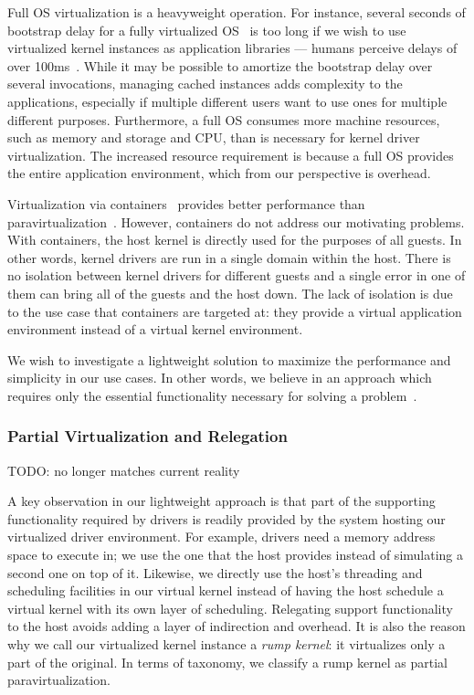 Full OS virtualization is a heavyweight operation.  For
instance, several seconds of bootstrap delay for a fully virtualized
OS~\cite{jiang:soda} is too long if we wish to use virtualized
kernel instances as application libraries --- humans perceive delays
of over 100ms~\cite{miller:100ms}.  While it may be possible to
amortize the bootstrap delay over several invocations, managing
cached instances adds complexity to the applications, especially
if multiple different users want to use ones for multiple different
purposes.  Furthermore, a full OS consumes more machine resources,
such as memory and storage and CPU, than is necessary for kernel
driver virtualization.  The increased resource requirement is because
a full OS provides the entire application environment, which from our
perspective is overhead.

Virtualization via containers~\cite{phk:jails} provides better
performance than
paravirtualization~\cite{soltesz:containers,wang:overhead}.
However, containers do not address our motivating problems.
With containers, the host kernel is directly used for the purposes
of all guests.  In other words, kernel drivers are run in a single
domain within the host.  There is no isolation between kernel
drivers for different guests and a single error in one of them can
bring all of the guests and the host down.  The lack of isolation is due
to the use case that containers are targeted at: they provide a virtual
application environment instead of a virtual kernel environment.

We wish to investigate a lightweight solution to maximize the
performance and simplicity in our use cases.  In other words, we
believe in an approach which requires only the essential
functionality necessary for solving a
problem~\cite{lampson:bestpaperever}.

\subsubsection{Partial Virtualization and Relegation}

TODO: no longer matches current reality

A key observation in our lightweight approach is that part of the
supporting functionality required by drivers is readily provided
by the system hosting our virtualized driver environment.  For
example, drivers need a memory address space to execute in; we use
the one that the host provides instead of simulating a second one
on top of it.  Likewise, we directly use the host's threading and
scheduling facilities in our virtual kernel instead of having the
host schedule a virtual kernel with its own layer of scheduling.
Relegating support functionality to the host avoids adding a layer
of indirection and overhead.  It is also the reason why we call
our virtualized kernel instance a \textit{rump kernel}: it virtualizes
only a part of the original.  In terms of taxonomy, we classify a
rump kernel as partial paravirtualization.

